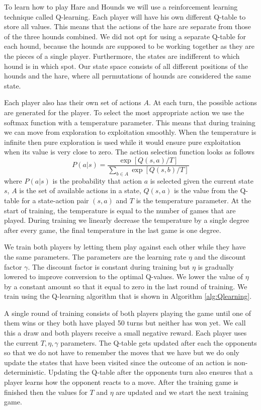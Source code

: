 To learn how to play Hare and Hounds we will use a reinforcement learning
technique called Q-learning\cite{watkins1992q}.
Each player will have his own different
Q-table to store all values. This means that the actions of the hare are
separate from those of the three hounds combined. We did not opt for using
a separate Q-table for each hound, because the hounds are supposed to be
working together as they are the pieces of a single player. Furthermore,
the states are indifferent to which hound is in which spot. Our state space
consists of all different positions of the hounds and the hare, where all
permutations of hounds are considered the same state.

Each player also has their own set of actions $A$. At each turn, the possible
actions are generated for the player. To select the most appropriate action we
use  the softmax function with a temperature parameter. This means that during
training we can move from exploration to exploitation smoothly. When the
temperature is infinite then pure exploration is used while it would ensure
pure exploitation when its value is very close to zero. The action selection
function looks as follows\cite{alpaydin}
\[ P(a|s) = \frac{\exp[Q(s,a)/T]}{\sum_{b \in A} \exp[Q(s, b)/T]} \]
where $P(a|s)$ is the probability that action $a$ is selected given the
current state $s$, $A$ is the set of available actions in a state, $Q(s,a)$ is
the value from the Q-table for a state-action pair $(s,a)$ and $T$ is the
temperature parameter. At the start of training, the temperature is equal to
the number of games that are played. During training we linearly decrease the
temperature by a single degree after every game, the final temperature in the
last game is one degree.

We train both players by letting them play against each other while they have
the same parameters. The parameters are the learning rate $\eta$ and the
discount factor $\gamma$. The discount factor is constant during training but
$\eta$ is gradually lowered to improve conversion to the optimal
Q-values\cite{alpaydin}. We lower the value of $\eta$ by a constant amount so
that it equal to zero in the last round of training. We train using the
Q-learning algorithm that is shown in Algorithm \autoref{alg:Qlearning}.

A single round of training consists of both players playing the game until one
of them wins or they both have played 50 turns but neither has won yet. We call
this a draw and both players receive a small negative reward. Each player uses
the current $T, \eta, \gamma$ parameters. The Q-table gets updated after each
the opponents so that we do not have to remember the moves that we have but we
do only update the states that have been visited since the outcome of an action
is non-deterministic. Updating the Q-table after the opponents turn also
ensures that a player learns how the opponent reacts to a move. After the
training game is finished then the values for $T$ and $\eta$ are updated and
we start the next training game.


